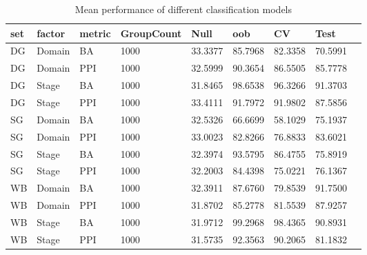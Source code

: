 \begin{table}
\centering
\begin{tabular}[0.2em]{@{}lllllllll@{}}\toprule
set & factor & metric & GroupCount & Null & oob & CV & Test\\\toprule[0.2em]
DG & Domain & BA & 1000 & 33.3377 & 85.7968 & 82.3358 & 70.5991 \\\midrule
DG & Domain & PPI & 1000 & 32.5999 & 90.3654 & 86.5505 & 85.7778 \\\midrule
DG & Stage & BA & 1000 & 31.8465 & 98.6538 & 96.3266 & 91.3703 \\\midrule
DG & Stage & PPI & 1000 & 33.4111 & 91.7972 & 91.9802 & 87.5856 \\\midrule
SG & Domain & BA & 1000 & 32.5326 & 66.6699 & 58.1029 & 75.1937 \\\midrule
SG & Domain & PPI & 1000 & 33.0023 & 82.8266 & 76.8833 & 83.6021 \\\midrule
SG & Stage & BA & 1000 & 32.3974 & 93.5795 & 86.4755 & 75.8919 \\\midrule
SG & Stage & PPI & 1000 & 32.2003 & 84.4398 & 75.0221 & 76.1367 \\\midrule
WB & Domain & BA & 1000 & 32.3911 & 87.6760 & 79.8539 & 91.7500 \\\midrule
WB & Domain & PPI & 1000 & 31.8702 & 85.2778 & 81.5539 & 87.9257 \\\midrule
WB & Stage & BA & 1000 & 31.9712 & 99.2968 & 98.4365 & 90.8931 \\\midrule
WB & Stage & PPI & 1000 & 31.5735 & 92.3563 & 90.2065 & 81.1832 \\\bottomrule[0.2em]
\end{tabular}
\caption{Mean performance of different classification models\label{tabel:ClassificationMeanPerf}}
\end{table}

